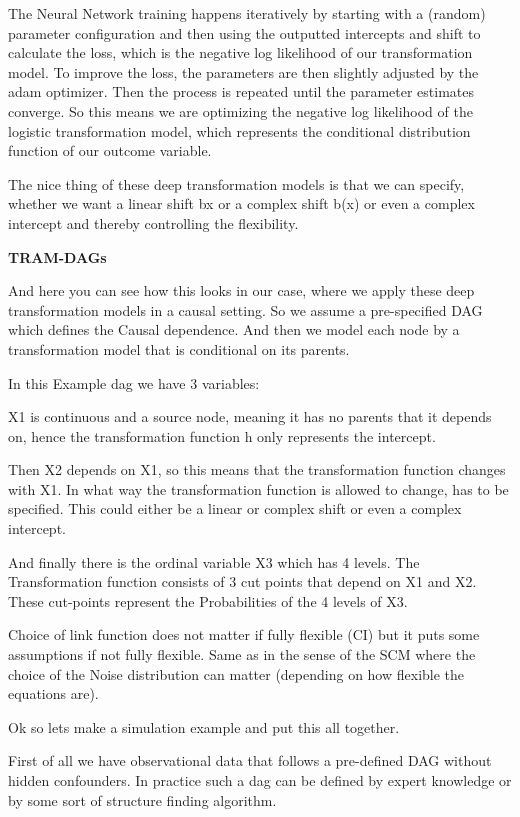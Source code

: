 The Neural Network training happens iteratively by starting with a (random) parameter configuration and then using the outputted intercepts and shift to calculate the loss, which is the negative log likelihood of our transformation model. To improve the loss, the parameters are then slightly adjusted by the adam optimizer. Then the process is repeated until the parameter estimates converge. So this means we are optimizing the negative log likelihood of the logistic transformation model, which represents the conditional distribution function of our outcome variable. 

The nice thing of these deep transformation models is that we can specify, whether we want a linear shift bx or a complex shift b(x) or even a complex intercept and thereby controlling the flexibility.


\textbf{TRAM-DAGs}

And here you can see how this looks in our case, where we apply these deep transformation models in a causal setting. So we assume a pre-specified DAG which defines the Causal dependence. And then we model each node by a transformation model that is conditional on its parents.

In this Example dag we have 3 variables:

X1 is continuous and a source node, meaning it has no parents that it depends on, hence the transformation function h only represents the intercept.

Then X2 depends on X1, so this means that the transformation function changes with X1. In what way the transformation function is allowed to change, has to be specified. This could either be a linear or complex shift or even a complex intercept.

And finally there is the ordinal variable X3 which has 4 levels. The Transformation function consists of 3 cut points that depend on X1 and X2. These cut-points represent the Probabilities of the 4 levels of X3.

Choice of link function does not matter if fully flexible (CI) but it puts some assumptions if not fully flexible. Same as in the sense of the SCM where the choice of the Noise distribution can matter (depending on how flexible the equations are).


Ok so lets make a simulation example and put this all together.

First of all we have observational data that follows a pre-defined DAG without hidden confounders. In practice such a dag can be defined by expert knowledge or by some sort of structure finding algorithm.

